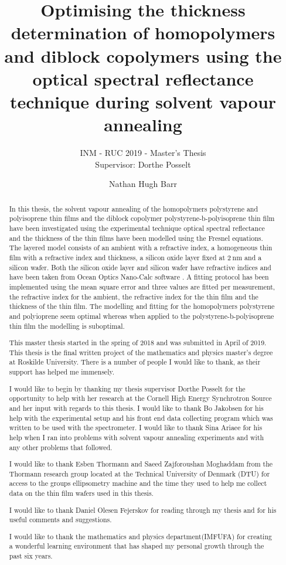\documentclass[12pt,a4paper]{report}
\author{Nathan Hugh Barr}
\title{Optimising the thickness determination of homopolymers and diblock copolymers using the optical spectral reflectance technique during solvent vapour annealing}
\subtitle{INM - RUC 2019 - Master's Thesis \\ Supervisor: Dorthe Posselt}
\begin{document}
\maketitle

\begin{abstract}

In this thesis, the solvent vapour annealing of the homopolymers polystyrene and polyisoprene thin films and the diblock copolymer polystyrene-b-polyisoprene thin film have been investigated using the experimental technique optical spectral reflectance and the thickness of the thin films have been modelled using the Fresnel equations. The layered model consists of an ambient with a refractive index, a homogeneous thin film with a refractive index and thickness, a silicon oxide layer fixed at $\SI{2}{\nano\meter}$ and a silicon wafer. Both the silicon oxide layer and silicon wafer have refractive indices and have been taken from Ocean Optics Nano-Calc software \cite{nanocalcmanual}.  A fitting protocol has been implemented using the mean square error and three values are fitted per measurement, the refractive index for the ambient, the refractive index for the thin film and the thickness of the thin film. The modelling and fitting for the homopolymers polystyrene and polyioprene seem optimal whereas when applied to the polystyrene-b-polyisoprene thin film the modelling is suboptimal.  

\end{abstract}

\renewcommand{\abstractname}{Acknowledgements}
\begin{abstract}
This master thesis started in the spring of 2018 and was submitted in April of 2019. This thesis is the final written project of the mathematics and physics master's degree at Roskilde University. There is a number of people I would like to thank, as their support has helped me immensely.

I would like to begin by thanking my thesis supervisor Dorthe Posselt for the opportunity to help with her research at the Cornell High Energy Synchrotron Source and her input with regards to this thesis. I would like to thank Bo Jakobsen for his help with the experimental setup and his front end data collecting program which was written to be used with the spectrometer. I would like to thank Sina Ariaee for his help when I ran into problems with solvent vapour annealing experiments and with any other problems that followed.

I would like to thank Esben Thormann and Saeed Zajforoushan Moghaddam from the Thormann research group located at the Technical University of Denmark (DTU) for access to the groups ellipsometry machine and the time they used to help me collect data on the thin film wafers used in this thesis.

I would like to thank Daniel Olesen Fejerskov for reading through my thesis and for his useful comments and suggestions.

I would like to thank the mathematics and physics department(IMFUFA) for creating a wonderful learning environment that has shaped my personal growth through the past six years.     

\end{abstract}
\end{document}
